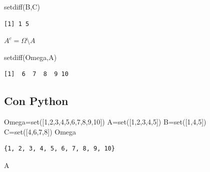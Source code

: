 \documentclass[
  letterpaper,
  DIV=11,
  numbers=noendperiod]{scrreprt}
\newenvironment{Shaded}{\begin{snugshade}}{\end{snugshade}}
\newcommand{\BuiltInTok}[1]{\textcolor[rgb]{0.00,0.23,0.31}{#1}}
\newcommand{\DecValTok}[1]{\textcolor[rgb]{0.68,0.00,0.00}{#1}}
\newcommand{\FunctionTok}[1]{\textcolor[rgb]{0.28,0.35,0.67}{#1}}
\newcommand{\NormalTok}[1]{\textcolor[rgb]{0.00,0.23,0.31}{#1}}
\newcommand{\OperatorTok}[1]{\textcolor[rgb]{0.37,0.37,0.37}{#1}}
\begin{document}
\begin{Shaded}
\begin{Highlighting}[]
\FunctionTok{setdiff}\NormalTok{(B,C)}
\end{Highlighting}
\end{Shaded}

\begin{verbatim}
[1] 1 5
\end{verbatim}

\(A^c=\Omega\setminus A\)

\begin{Shaded}
\begin{Highlighting}[]
\FunctionTok{setdiff}\NormalTok{(Omega,A)}
\end{Highlighting}
\end{Shaded}

\begin{verbatim}
[1]  6  7  8  9 10
\end{verbatim}

\subsection{Con Python}\label{con-python}

\begin{Shaded}
\begin{Highlighting}[]
\NormalTok{Omega}\OperatorTok{=}\BuiltInTok{set}\NormalTok{([}\DecValTok{1}\NormalTok{,}\DecValTok{2}\NormalTok{,}\DecValTok{3}\NormalTok{,}\DecValTok{4}\NormalTok{,}\DecValTok{5}\NormalTok{,}\DecValTok{6}\NormalTok{,}\DecValTok{7}\NormalTok{,}\DecValTok{8}\NormalTok{,}\DecValTok{9}\NormalTok{,}\DecValTok{10}\NormalTok{])}
\NormalTok{A}\OperatorTok{=}\BuiltInTok{set}\NormalTok{([}\DecValTok{1}\NormalTok{,}\DecValTok{2}\NormalTok{,}\DecValTok{3}\NormalTok{,}\DecValTok{4}\NormalTok{,}\DecValTok{5}\NormalTok{])}
\NormalTok{B}\OperatorTok{=}\BuiltInTok{set}\NormalTok{([}\DecValTok{1}\NormalTok{,}\DecValTok{4}\NormalTok{,}\DecValTok{5}\NormalTok{])}
\NormalTok{C}\OperatorTok{=}\BuiltInTok{set}\NormalTok{([}\DecValTok{4}\NormalTok{,}\DecValTok{6}\NormalTok{,}\DecValTok{7}\NormalTok{,}\DecValTok{8}\NormalTok{])}
\NormalTok{Omega}
\end{Highlighting}
\end{Shaded}

\begin{verbatim}
{1, 2, 3, 4, 5, 6, 7, 8, 9, 10}
\end{verbatim}

\begin{Shaded}
\begin{Highlighting}[]
\NormalTok{A}
\end{Highlighting}
\end{Shaded}
\end{document}
